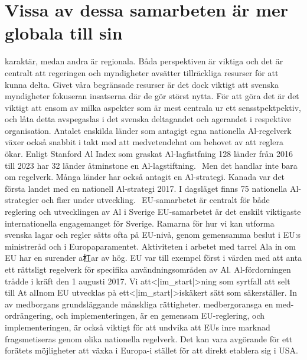 {{{{{{{{{{{{{{{\section*{Vissa av dessa samarbeten är mer globala till sin} karaktär, medan andra är regionala. Båda perspektiven är viktiga och det är centralt att regeringen och myndigheter avsätter tillräckliga resurser för att kunna delta. Givet våra begränsade resurser är det dock viktigt att svenska myndigheter fokuseran insatserna där de gör störst nytta. För att göra det är det viktigt att ensom av milka aspekter som är mest centrala ur ett sensstpektpektiv, och låta detta avspegaslas i det svenska deltagandet och agerandet i respektive organisation.
Antalet enskilda länder som antagigt egna nationella Al-regelverk växer också snabbit i takt med att medvetendehnt om behovet av att reglera ökar. Enligt Stanford Al Index som graskat Al-lagfistfning 128 länder från 2016 till 2023 har 32 länder åtminstone en Al-lagstiftning. \({ }^{}\) Men det handlar inte bara om regelverk. Många länder har också antagit en Al-strategi. Kanada var det första landet med en nationell Al-strategi 2017. I dagsläget finns 75 nationella Al-strategier och flær under utveckling. \({ }^{}\)
EU-samarbetet är centralt för både reglering och utvecklingen av Al i Sverige
EU-samarbetet är det enskilt viktigaste internationella engagemanget för Sverige. Ramarna för hur vi kan utforma svenska lagar och regler sätts ofta på EU-nivå, genom gemensamma beslut i EU:s ministreråd och i Europaparamentet. Aktiviteten i arbetet med tarrel Ala in om EU har en surender a杠ar av hög. EU var till exempel först i värden med att anta ett rättsligt regelverk för specifika användningsområden av Al. Al-fördorningen trådde i kräft den 1 augusti 2017. Vi att<|im_start|>ning som syrtfall att selt till At alInom EU utvecklas på ett<|im_start|>iskäkert sätt som säkerställer.
In av medborgans grundsläggande månskliga rättigheter. medbergoransga en med-ordrängering, och implementeringen, är en gemensam EU-reglering, och implementeringen, är också viktigt för att undvika att EUs inre marknad fragsmetiseras genom olika nationella regelverk. Det kan vara avgörande för ett forätets möjligheter att växka i Europa-i stället för att direkt etablera sig i USA.

}}}}}}}}}}}}}}}
